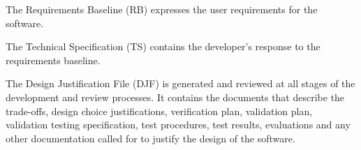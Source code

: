 





The Requirements Baseline (RB) expresses the user requirements for the software.


The Technical Specification (TS)  contains the developer's response to the
requirements baseline. %


The Design Justification File (DJF) is generated and reviewed at all stages of the development
and review processes.  It contains the documents that describe the trade-offs, design choice
justifications, verification plan, validation plan, validation testing specification,
test procedures, test results, evaluations and any other documentation called for to justify
the design of the software.


